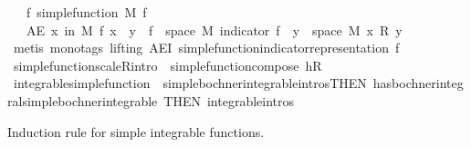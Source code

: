 \begin{isabellebody}
\ \ \ f{\isacharcolon}{\kern0pt}\ {\isachardoublequoteopen}simple{\isacharunderscore}{\kern0pt}function\ M\ f{\isachardoublequoteclose}\isanewline
\ \ \ {\isachardoublequoteopen}AE\ x\ in\ M{\isachardot}{\kern0pt}\ f\ x\ {\isacharequal}{\kern0pt}\ {\isacharparenleft}{\kern0pt}{\isasymSum}y\ {\isasymin}\ f\ {\isacharbackquote}{\kern0pt}\ space\ M{\isachardot}{\kern0pt}\ indicator\ {\isacharparenleft}{\kern0pt}f\ {\isacharminus}{\kern0pt}{\isacharbackquote}{\kern0pt}\ {\isacharbraceleft}{\kern0pt}y{\isacharbraceright}{\kern0pt}\ {\isasyminter}\ space\ M{\isacharparenright}{\kern0pt}\ x\ {\isacharasterisk}{\kern0pt}\isactrlsub R\ y{\isacharparenright}{\kern0pt}{\isachardoublequoteclose}\ \ \isanewline
%
\isadelimproof
\ \ %
\endisadelimproof
%
\isatagproof
{}\isamarkupfalse%
\ {\isacharparenleft}{\kern0pt}metis\ {\isacharparenleft}{\kern0pt}mono{\isacharunderscore}{\kern0pt}tags{\isacharcomma}{\kern0pt}\ lifting{\isacharparenright}{\kern0pt}\ AE{\isacharunderscore}{\kern0pt}I{}\ simple{\isacharunderscore}{\kern0pt}function{\isacharunderscore}{\kern0pt}indicator{\isacharunderscore}{\kern0pt}representation\ f{\isacharparenright}{\kern0pt}%
\endisatagproof
{\isafoldproof}%
%
\isadelimproof
\isanewline
%
\endisadelimproof
\isanewline
{}\isamarkupfalse%
\ simple{\isacharunderscore}{\kern0pt}function{\isacharunderscore}{\kern0pt}scaleR{\isacharbrackleft}{\kern0pt}intro{\isacharbrackright}{\kern0pt}\ {\isacharequal}{\kern0pt}\ simple{\isacharunderscore}{\kern0pt}function{\isacharunderscore}{\kern0pt}compose{}{\isacharbrackleft}{\kern0pt}\ h{\isacharequal}{\kern0pt}{\isachardoublequoteopen}{\isacharparenleft}{\kern0pt}{\isacharasterisk}{\kern0pt}\isactrlsub R{\isacharparenright}{\kern0pt}{\isachardoublequoteclose}{\isacharbrackright}{\kern0pt}\isanewline
{}\isamarkupfalse%
\ integrable{\isacharunderscore}{\kern0pt}simple{\isacharunderscore}{\kern0pt}function\ {\isacharequal}{\kern0pt}\ simple{\isacharunderscore}{\kern0pt}bochner{\isacharunderscore}{\kern0pt}integrable{\isachardot}{\kern0pt}intros{\isacharbrackleft}{\kern0pt}THEN\ has{\isacharunderscore}{\kern0pt}bochner{\isacharunderscore}{\kern0pt}integral{\isacharunderscore}{\kern0pt}simple{\isacharunderscore}{\kern0pt}bochner{\isacharunderscore}{\kern0pt}integrable{\isacharcomma}{\kern0pt}\ THEN\ integrable{\isachardot}{\kern0pt}intros{\isacharbrackright}{\kern0pt}%
\begin{isamarkuptext}%
Induction rule for simple integrable functions.%
\end{isamarkuptext}\isamarkuptrue%

\end{isabellebody}

